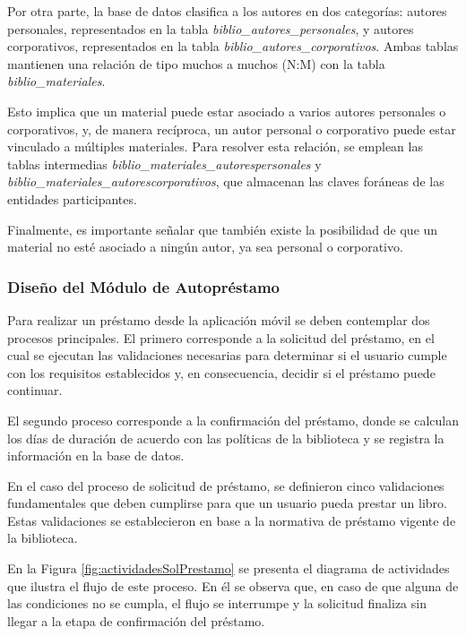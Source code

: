 \documentclass[spanish]{ieee_upb}
\begin{document}
Por otra parte, la base de datos clasifica a los autores en dos categorías: autores personales, representados en la tabla \textit{biblio\_autores\_personales}, y autores corporativos, representados en la tabla \textit{biblio\_autores\_corporativos}. Ambas tablas mantienen una relación de tipo muchos a muchos (N:M) con la tabla \textit{biblio\_materiales}.
\vspace{0.3 cm}

Esto implica que un material puede estar asociado a varios autores personales o corporativos, y, de manera recíproca, un autor personal o corporativo puede estar vinculado a múltiples materiales. Para resolver esta relación, se emplean las tablas intermedias \textit{biblio\_materiales\_autorespersonales} y \textit{biblio\_materiales\_autorescorporativos}, que almacenan las claves foráneas de las entidades participantes.
\vspace{0.3 cm}

Finalmente, es importante señalar que también existe la posibilidad de que un material no esté asociado a ningún autor, ya sea personal o corporativo.



\subsubsection{Diseño del Módulo de Autopréstamo}
Para realizar un préstamo desde la aplicación móvil se deben contemplar dos procesos principales. El primero corresponde a la solicitud del préstamo, en el cual se ejecutan las validaciones necesarias para determinar si el usuario cumple con los requisitos establecidos y, en consecuencia, decidir si el préstamo puede continuar. 
\vspace{0.3 cm}

El segundo proceso corresponde a la confirmación del préstamo, donde se calculan los días de duración de acuerdo con las políticas de la biblioteca y se registra la información en la base de datos.
\vspace{0.3 cm}

En el caso del proceso de solicitud de préstamo, se definieron cinco validaciones fundamentales que deben cumplirse para que un usuario pueda prestar un libro. Estas validaciones se establecieron en base a la normativa de préstamo vigente de la biblioteca. 
\vspace{0.3 cm}

En la Figura \ref{fig:actividadesSolPrestamo} se presenta el diagrama de actividades que ilustra el flujo de este proceso. En él se observa que, en caso de que alguna de las condiciones no se cumpla, el flujo se interrumpe y la solicitud finaliza sin llegar a la etapa de confirmación del préstamo.
\end{document}
